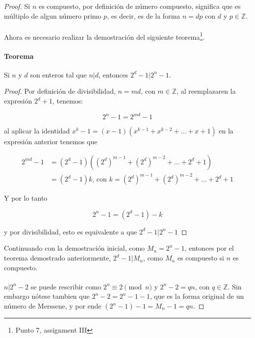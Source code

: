 \documentclass{article}
\begin{document}
\begin{proof}
Si $n$ es compuesto, por definición de número compuesto, significa que es múltiplo de algun número primo $p$, es decir, es de la forma $n = dp$ con $d$ y $p \in \mathbb{Z}$.

\paragraph{} Ahora es necesario realizar la demostración del siguiente teorema\footnote{Punto 7, assignment III}.

\paragraph{Teorema} Si $n$ y $d$ son enteros tal que $n|d$, entonces $2^d - 1 | 2^n - 1$.

\begin{proof}
Por definición de divisibilidad, $n = md$, con $m \in \mathbb{Z}$, al reemplazaren la expresión $2^{d} + 1$, tenemos:
	
	$$2^n -1 = 2^{md} - 1$$

al aplicar la identidad $x^k - 1 = (x-1)(x^{k-1} + x^{k-2} + \dots + x + 1)$ en la expresión anterior tenemos que

\begin{align*}
	2^{md} - 1 &= (2^d - 1) ((2^{d})^{m - 1} + (2^{d})^{m - 2} + \dots + 2^d + 1)\\
	&= (2^d - 1) k \text{, con } k = (2^d)^{m-1} + (2^d)^{m-2} + \dots + 2^d + 1
\end{align*}

Y por lo tanto 

$$2^n - 1 = (2^d - 1) - k$$

y  por divisibilidad, esto es equivalente a que $2^d - 1 | 2^n - 1$
\end{proof}

Continuando con la demostración inicial, como $M_n = 2^n -1$, entonces por el teorema demostrado anteriormente, $2^d - 1 | M_n$, como $M_n$ es compuesto si $n$ es compuesto.

\paragraph{} $n|2^n - 2$ se puede rescribir como $2^n \equiv 2 \pmod{n}$ y $2^n - 2 = qn$, con $q \in \mathbb{Z}$. Sin embargo nótese tambien que $2^n - 2 = 2^n - 1 - 1$, que es la forma original de un número de Merssene, y por ende $(2^n - 1) - 1 = M_n - 1 = qn$.


\end{proof}
\end{document}
